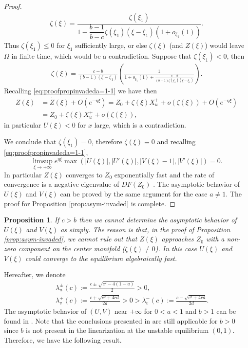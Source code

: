 \documentclass[11pt,a4paper]{article}
\newtheorem{proposition}[theorem]{\textbf{Proposition}}
\numberwithin{equation}{section}
\numberwithin{figure}{section}
\newcommand\beaa{\begin{eqnarray*}}
\newcommand\eeaa{\end{eqnarray*}}
\begin{document}
\begin{proof}
\begin{gather*}
        \zeta(\xi) = \dfrac{\zeta(\xi_1)}{1-\dfrac{b-1}{b-c}\zeta(\xi_1)(\xi-\xi_1)(1+o_{\xi_1}(1))} . 
    \end{gather*}
    Thus $\zeta(\xi_1)\leq 0$ for $\xi_1$ sufficiently large, or else $\zeta(\xi)$ (and $Z(\xi)$) would leave $\Omega$ in finite time, which would be a contradiction. Suppose that $\zeta(\xi_1)<0$, then 
    \begin{gather*}
        \zeta(\xi) =\frac{c-b}{(b-1)(\xi-\xi_1)} \left(\frac{1}{1+o_{\xi_1}(1)+\frac{c-b}{(b-1)\zeta(\xi_1)(\xi-\xi_1)}}\right) . 
    \end{gather*}
    Recalling \eqref{eq:proofpropinvadeda=1-1} we have then
    \begin{align*}
        Z(\xi) &= \tilde Z(\xi)+O(e^{-\eta \xi}) = Z_0+\zeta(\xi) X_{u}^{+} + o(\zeta(\xi)) + O(e^{-\eta \xi}) \\
        &= Z_0+\zeta(\xi) X_{u}^{+} + o(\zeta(\xi)) ,
    \end{align*}
    in particular $U(\xi)<0$ for $x$ large, which is a contradiction. 
   

   We conclude that $\zeta(\xi_1)=0$, therefore  $\zeta(\xi)\equiv 0$ and recalling \eqref{eq:proofpropinvadeda=1-1}, 
    \begin{equation*}
        \limsup_{\xi\to +\infty} e^{\eta \xi}\max(|U(\xi)|, |U'(\xi)|, |V(\xi)-1|, |V'(\xi)|)=0. 
    \end{equation*}
    In particular $Z(\xi)$ converges to $ Z_0$ exponentially fast and the rate of convergence is a negative eigenvalue of $DF(Z_0)$ \cite[Chap. 13, Theorem 4.3 p.335]{CoddingtonLevison}. The asymptotic behavior of $U(\xi)$ and $V(\xi)$ can be proved by the same argument for the case $a\neq 1$. The proof for Proposition \ref{prop:asym-invaded} is complete.
\end{proof}
\begin{proposition}\label{prop decay rate a=1}
 If $c>b$ then we cannot determine the asymptotic behavior of $U(\xi)$ and $V(\xi)$ as simply. The reason is that, in the proof of Proposition \ref{prop:asym-invaded}, we cannot rule out that $Z(\xi)$ approaches $Z_0$ with a non-zero component on the center manifold ($\zeta(\xi)\neq 0$). In this case $U(\xi)$ and $V(\xi)$ could converge to the equilibrium algebraically fast.
\end{proposition}


Hereafter, we denote
\beaa
&&\lambda_u^{\pm}(c):=\frac{c\pm\sqrt{c^2-4(1-a)}}{2}>0,\\ &&\lambda_v^{+}(c):=\frac{c+\sqrt{c^2+4rd}}{2d}>0>\lambda_v^{-}(c):=\frac{c-\sqrt{c^2+4rd}}{2d}.
\eeaa
The asymptotic behavior of $(U,V)$ near $+\infty$ for $0<a<1$ and $b>1$ can be found in \cite{MoritaTachibana2009}.
Note that the conclusions presented in \cite{MoritaTachibana2009} are still applicable for $b>0$ since $b$ is not present in the linearization at the unstable equilibrium $(0,1)$. Therefore, we have the following result.
\end{document}
